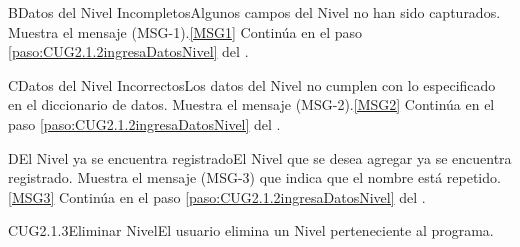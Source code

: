 	\begin{UCtrayectoriaA}{B}{Datos del Nivel Incompletos}{Algunos campos del Nivel no han sido capturados.}
			\UCpaso Muestra el mensaje (MSG-1).\ref{MSG1}
			\UCpaso Continúa en el paso \ref{paso:CUG2.1.2ingresaDatosNivel} del .
	\end{UCtrayectoriaA}

	\begin{UCtrayectoriaA}{C}{Datos del Nivel Incorrectos}{Los datos del Nivel no cumplen con lo especificado en el diccionario de datos.}
			\UCpaso Muestra el mensaje (MSG-2).\ref{MSG2}
			\UCpaso Continúa en el paso \ref{paso:CUG2.1.2ingresaDatosNivel} del .
	\end{UCtrayectoriaA}

		\begin{UCtrayectoriaA}{D}{El Nivel ya se encuentra registrado}{El Nivel que se desea agregar ya se encuentra registrado.}
			\UCpaso Muestra el mensaje (MSG-3) que indica que el nombre está repetido.\ref{MSG3}
			\UCpaso Continúa en el paso \ref{paso:CUG2.1.2ingresaDatosNivel} del .
		\end{UCtrayectoriaA}

	\begin{UseCase}{CUG2.1.3}{Eliminar Nivel}{El usuario elimina un Nivel perteneciente al programa.}
	\end{UseCase}

